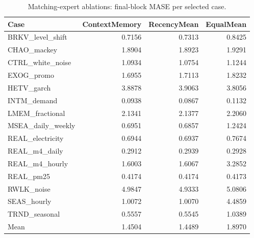 \begin{longtable}{lrrr}
\caption{Matching-expert ablations: final-block MASE per selected case.}\\
\toprule Case & ContextMemory & RecencyMean & EqualMean\\\midrule\endhead
BRKV\_level\_shift & 0.7156 & 0.7313 & 0.8425\\
CHAO\_mackey & 1.8904 & 1.8923 & 1.9291\\
CTRL\_white\_noise & 1.0934 & 1.0754 & 1.1244\\
EXOG\_promo & 1.6955 & 1.7113 & 1.8232\\
HETV\_garch & 3.8878 & 3.9063 & 3.8056\\
INTM\_demand & 0.0938 & 0.0867 & 0.1132\\
LMEM\_fractional & 2.1341 & 2.1377 & 2.2060\\
MSEA\_daily\_weekly & 0.6951 & 0.6857 & 1.2424\\
REAL\_electricity & 0.6944 & 0.6937 & 0.7674\\
REAL\_m4\_daily & 0.2912 & 0.2939 & 0.2928\\
REAL\_m4\_hourly & 1.6003 & 1.6067 & 3.2852\\
REAL\_pm25 & 0.4174 & 0.4174 & 0.4173\\
RWLK\_noise & 4.9847 & 4.9333 & 5.0806\\
SEAS\_hourly & 1.0072 & 1.0070 & 4.4859\\
TRND\_seasonal & 0.5557 & 0.5545 & 1.0389\\
\midrule Mean & 1.4504 & 1.4489 & 1.8970\\
\bottomrule
\end{longtable}
